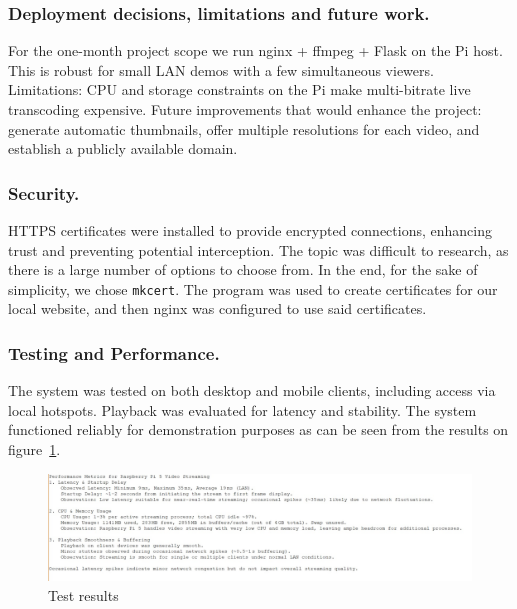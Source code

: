 \documentclass[11pt]{article}
\begin{document}
\subsubsection{Deployment decisions, limitations and future work.}
For the one-month project scope we run nginx + ffmpeg + Flask on the Pi host. This is robust for small LAN demos with a few simultaneous viewers. Limitations: CPU and storage constraints on the Pi make multi-bitrate live transcoding expensive. Future improvements that would enhance the project: generate automatic thumbnails, offer multiple resolutions for each video, and establish a publicly available domain.

\subsubsection{Security.} HTTPS certificates were installed to provide encrypted connections, enhancing trust and preventing potential interception. The topic was difficult to research, as there  is a large number of options to choose from. In the end, for the sake of simplicity, we chose \texttt{mkcert}. The program was used to create 
certificates for our local website, and then nginx was configured to use said certificates.

\subsubsection{Testing and Performance.} The system was tested on both desktop and mobile clients, including access via local hotspots. Playback was evaluated for latency and stability. The system functioned reliably for demonstration purposes as can be seen from the results on figure~\ref{fig:test-results}.

\begin{figure}[H]
    \centering
    \includegraphics[width=1\linewidth]{test-results.jpeg}
    \caption{Test results}
    \label{fig:test-results}
\end{figure}
\end{document}

